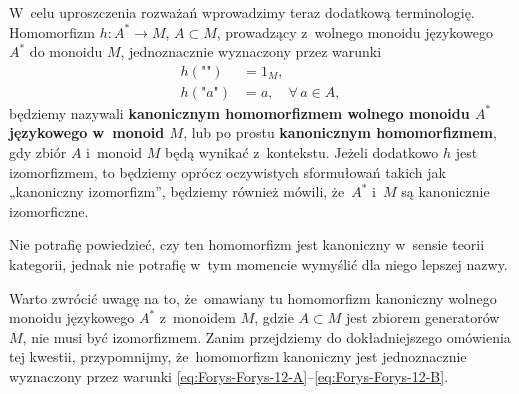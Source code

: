 \documentclass[a4paper,11pt]{article}
\begin{document}
\vspace{\spaceFour}





\start {} W~celu uproszczenia rozważań wprowadzimy teraz dodatkową
terminologię. Homomorfizm $h : A^{ * } \to M$, $A \subset M$, prowadzący z~wolnego
monoidu językowego $A^{ * }$ do monoidu $M$, jednoznacznie wyznaczony przez
warunki
\begin{subequations}
  \begin{align}
    \label{eq:Forys-Forys-12-A}
    h( \texttt{""} ) &= 1_{ M }, \\
    \label{eq:Forys-Forys-12-B}
    h( \texttt{"} a \texttt{"} ) &= a, \quad
                                   \forall \, a \in A,
  \end{align}
\end{subequations}
będziemy nazywali \textbf{kanonicznym homomorfizmem wolnego monoidu $A^{ * }$
  językowego w~monoid $M$}, lub po prostu \textbf{kanonicznym
  homomorfizmem}, gdy zbiór $A$ i~monoid $M$ będą wynikać z~kontekstu.
Jeżeli dodatkowo $h$ jest izomorfizmem, to będziemy oprócz oczywistych
sformułowań takich jak „kanoniczny izomorfizm”, będziemy również mówili,
że~$A^{ * }$ i~$M$ są kanonicznie izomorficzne.

Nie potrafię powiedzieć, czy ten homomorfizm jest kanoniczny w~sensie teorii
kategorii, jednak nie potrafię w~tym momencie wymyślić dla niego lepszej
nazwy.

\vspace{\spaceFour}




\start {} Warto zwrócić uwagę na to, że~omawiany tu homomorfizm
kanoniczny wolnego monoidu językowego $A^{ * }$ z~monoidem $M$, gdzie
$A \subset M$ jest zbiorem generatorów $M$, nie musi być izomorfizmem. Zanim
przejdziemy do dokładniejszego omówienia tej kwestii, przypomnijmy,
że~homomorfizm kanoniczny jest jednoznacznie wyznaczony przez warunki
\eqref{eq:Forys-Forys-12-A}--\eqref{eq:Forys-Forys-12-B}.
\end{document}
